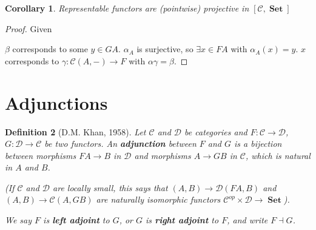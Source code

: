 \documentclass[a4paper]{article}
\newtheorem{definition}{Definition}
\newtheorem{corollary}[definition]{Corollary}
\numberwithin{definition}{section}
\DeclareMathOperator{\Set}{\textbf{Set}}
\begin{document}
\begin{corollary}
	Representable functors are (pointwise) projective in $[\mathcal{C}, \Set]$
\end{corollary}
\begin{proof}
	Given
	\begin{center}
	\end{center}
	$\beta$ corresponds to some $y \in GA$. 
	$\alpha_A$ is surjective, so $\exists x \in FA$ with $\alpha_A(x)=y$.
	$x$ corresponds to $\gamma: \mathcal{C}(A, -) \to F$ with $\alpha\gamma = \beta$.
\end{proof}

\section{Adjunctions}
\begin{definition}[D.M. Khan, 1958]
	Let $\mathcal{C}$ and $\mathcal{D}$ be categories and $F: \mathcal{C} \to \mathcal{D}$, $G: \mathcal{D} \to \mathcal{C}$ be two functors.
	An \textbf{adjunction} between $F$ and $G$ is a bijection between morphisms $FA \to B$ in $\mathcal{D}$ and morphisms $A \to GB$ in $\mathcal{C}$, 
	which is natural in $A$ and $B$.

	(If $\mathcal{C}$ and $\mathcal{D}$ are locally small,
	this says that $(A, B) \to \mathcal{D}(FA, B)$ and $(A, B) \to \mathcal{C}(A, GB)$
	are naturally isomorphic functors $\mathcal{C}^{op} \times \mathcal{D} \to \Set$).
	
	We say $F$ is \textbf{left adjoint} to $G$,
	or $G$ is \textbf{right adjoint} to $F$,
	and write $F \dashv G$.
\end{definition}
\end{document}
